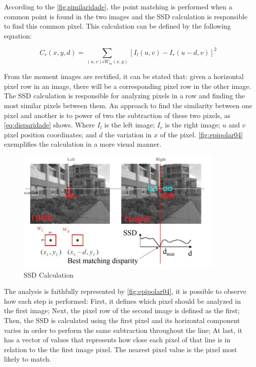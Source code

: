     According to the \autoref{fig:similaridade}, the point matching is performed when a common point is found in the two images and the SSD calculation is responsible to find this common pixel. This calculation can be defined by the following equation:
    
    \begin{center}
        \begin{equation}\label{eq:disparidade}
        C_{r}(x, y, d) = \sum_{(u,v)\epsilon W_{m}(x,y)}[I_{l}(u,v)-I_{r}(u-d, v)]^{2}
        \end{equation}
    \end{center}
    
    From the moment images are rectified, it can be stated that: given a horizontal pixel row in an image, there will be a corresponding pixel row in the other image. The SSD calculation is responsible for analyzing pixels in a row and finding the most similar pixels between them. An approach to find the similarity between one pixel and another is to power of two the subtraction of these two pixels, as \autoref{eq:disparidade} shows. Where \(I_{l}\) is the left image; \(I_{r}\) is the right image; \(u\) and \(v\) pixel position coordinates; and \(d\) the variation in \(x\) of the pixel. \autoref{fig:epipolar04} exemplifies the calculation in a more visual manner.
    
    \begin{figure}[H]
     \caption{\label{fig:epipolar04}
SSD Calculation}
     \begin{center}
        \includegraphics[width=0.9\textwidth]{images/matching_point.png}
     \end{center}
    \end{figure}
    
    The analysis is faithfully represented by \autoref{fig:epipolar04}, it is possible to observe how each step is performed: First, it defines which pixel should be analyzed in the first image; Next, the pixel row of the second image is defined as the first; Then, the SSD is calculated using the first pixel and its horizontal component varies in order to perform the same subtraction throughout the line; At last, it has a vector of values that represents how close each pixel of that line is in relation to the the first image pixel. The nearest pixel value is the pixel most likely to match.
    
